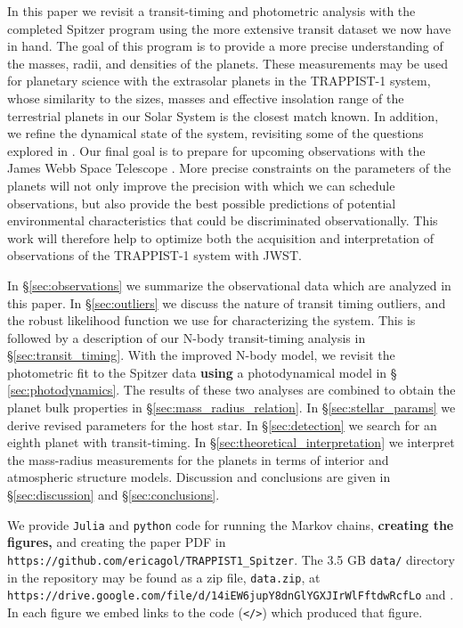 \documentclass[twocolumn]{aastex63}
\begin{document}
In this paper we revisit a transit-timing and photometric analysis with the completed
Spitzer program using the more extensive transit dataset we now have in hand.  The goal of
this program is to provide a more precise understanding of the masses, radii, and
densities of the planets.  These measurements may be used for planetary science with the extrasolar planets in the TRAPPIST-1 system, whose similarity to the sizes, masses  and effective insolation range of the terrestrial planets in our Solar System is the closest match known.  In addition, we refine the dynamical
state of the system, revisiting some of the questions explored in \citet{Grimm2018}.
Our final goal is to prepare for upcoming observations with the James Webb Space
Telescope \citep[JWST;][]{Gardner2006}.  More precise constraints on the parameters of the planets will not only improve the precision with which we can schedule observations, but also provide the best possible predictions of potential environmental characteristics that could be discriminated observationally.  This work will therefore help to optimize both the acquisition and interpretation of observations of the TRAPPIST-1 system with JWST.

In \S \ref{sec:observations} we summarize the observational data which are analyzed
in this paper.  In \S \ref{sec:outliers} we discuss the nature of transit
timing outliers, and the robust likelihood function we use for characterizing the
system.  This is followed by a description of our N-body transit-timing analysis
in \S \ref{sec:transit_timing}.  With the improved N-body model, we revisit the
photometric fit to the Spitzer data \textbf{using} a photodynamical model in \S
\ref{sec:photodynamics}.  The results of these two analyses are combined to
obtain the planet bulk properties in \S \ref{sec:mass_radius_relation}.  In \S \ref{sec:stellar_params} we derive revised parameters for the host star.  In \S \ref{sec:detection} we search for an eighth planet with transit-timing.  In \S \ref{sec:theoretical_interpretation} we interpret the mass-radius measurements for the planets in terms of interior and atmospheric structure models.  Discussion and conclusions
are given in \S \ref{sec:discussion} and \S \ref{sec:conclusions}.

We provide \texttt{Julia} and \texttt{python} code for running the Markov chains,
\textbf{creating the figures,}
and creating the paper PDF in
\texttt{https://github.com/ericagol/TRAPPIST1\_Spitzer}.  
The 3.5 GB \texttt{data/} directory in the repository may be found as a
zip file, \texttt{data.zip}, at 
\texttt{\scriptsize https://drive.google.com/file/d/14iEW6jupY8dnGlYGXJIrWlFftdwRcfLo}
and .
In each figure we embed links to the code (\texttt{</>}) which produced that figure.
\end{document}
